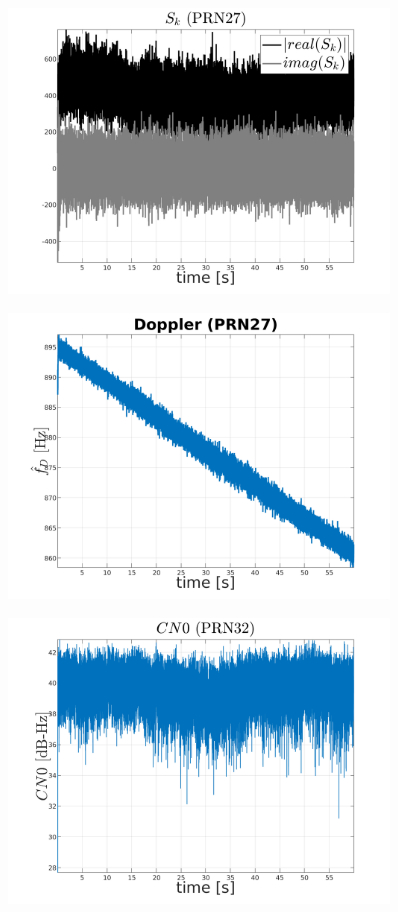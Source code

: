 \begin{figure}[H]
	\centering
	\includegraphics[width=0.9\textwidth]{fig/sk_PRN27.png}
\end{figure}

\begin{figure}[H]
	\centering
	\includegraphics[width=0.9\textwidth]{fig/doppler_PRN27.png}
\end{figure}

\begin{figure}[H]
	\centering
	\includegraphics[width=0.9\textwidth]{fig/CN0_PRN32.png}
\end{figure}

